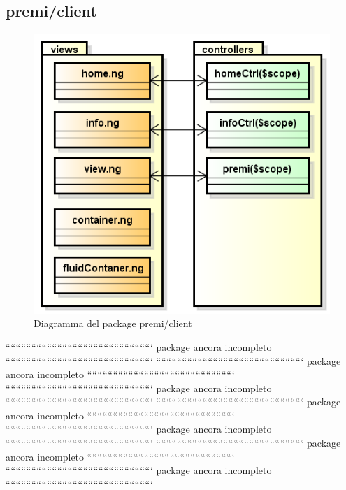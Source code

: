 \subsection{premi/client}
\begin{figure}[h]
\begin{center}
\includegraphics[scale=0.90]{img/diapkg/client.png}
\caption{Diagramma del package premi/client}
\end{center}
\end{figure}

`````````````````````````````````````````````````````````
package ancora incompleto
`````````````````````````````````````````````````````````
`````````````````````````````````````````````````````````
package ancora incompleto
`````````````````````````````````````````````````````````
`````````````````````````````````````````````````````````
package ancora incompleto
`````````````````````````````````````````````````````````
`````````````````````````````````````````````````````````
package ancora incompleto
`````````````````````````````````````````````````````````
`````````````````````````````````````````````````````````
package ancora incompleto
`````````````````````````````````````````````````````````
`````````````````````````````````````````````````````````
package ancora incompleto
`````````````````````````````````````````````````````````
`````````````````````````````````````````````````````````
package ancora incompleto
`````````````````````````````````````````````````````````
